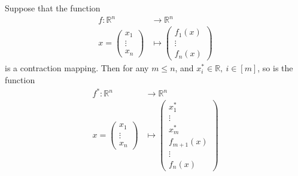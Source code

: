\begin{lemma}\label{lemma:contraction_intervene}
Suppose that the function
\begin{align*}
f: \mathbb{R}^n & \rightarrow \mathbb{R}^n \\
 x = \begin{pmatrix}x_1\\ \vdots \\ x_n \end{pmatrix}
 & \mapsto \begin{pmatrix}f_1(x)\\ \vdots \\ f_n(x) \end{pmatrix}
\end{align*}
is a contraction mapping. Then for any $m \leq n$, and $x^*_i \in \mathbb{R}, \: i \in [m]$, so is the function
\begin{align*}
f^*: \mathbb{R}^n & \rightarrow \mathbb{R}^n \\
 x = \begin{pmatrix}x_1\\ \vdots \\ x_n \end{pmatrix}
 & \mapsto \begin{pmatrix}x^*_1\\ \vdots \\ x^*_m \\ f_{m+1}(x) \\ \vdots \\ f_n(x) \end{pmatrix}
\end{align*}
\end{lemma}
%
